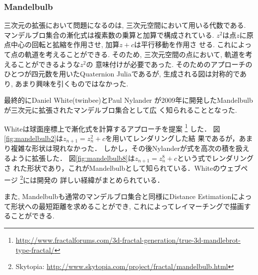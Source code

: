 \subsubsection{Mandelbulb}

三次元の拡張において問題になるのは, 三次元空間において用いる代数である.
マンデルブロ集合の漸化式は複素数の乗算と加算で構成されている.
$z^2$は点$z$に原点中心の回転と拡縮を作用させ, 加算$z + c$は平行移動を作用さ
せる. これによって点の軌道を考えることができる.
そのため, 三次元空間の点において, 軌道を考えることができるような$z^2$の
意味付けが必要であった.
そのためのアプローチのひとつが四元数を用いたQuaternion Juliaであるが,
生成される図は対称的であり, あまり興味を引くものではなかった.

最終的にDaniel White(twinbee)とPaul Nylander
が2009年に開発したMandelbulbが三次元に拡張されたマンデルブロ集合として広
く知られることとなった.

Whiteは球面座標上で漸化式を計算するアプローチを提案
\footnote{\url{http://www.fractalforums.com/3d-fractal-generation/true-3d-mandlebrot-type-fractal/}}
した．
図\ref{fig:mandelbulb2}は$z_{n+1} = z_n^2 + c$を用いてレンダリングした結
果であるが，あまり複雑な形状は現れなかった．
しかし，その後Nylanderが式を高次の積を扱えるように拡張した．
図\ref{fig:mandelbulb8}は$z_{n+1} = z_n^8 + c $という式でレンダリングさ
れた形状であり，これがMandelbulbとして知られている．Whiteのウェブページ
\footnote{Skytopia:
\url{http://www.skytopia.com/project/fractal/mandelbulb.html}}には開発の
詳しい経緯がまとめられている．

また, Mandelbulbも通常のマンデルブロ集合と同様にDistance Estimationによっ
て形状への最短距離を求めることができ, これによってレイマーチングで描画す
ることができる.

